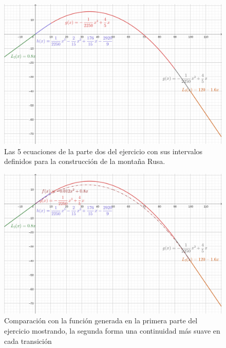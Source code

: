 \begin{figure}
	\centering
	\includegraphics[height = 0.25\textheight]{recursos/geogebra-export2.png}\par
	\caption*{Las 5 ecuaciones de la parte dos del ejercicio con sus intervalos definidos para la construcción de la montaña Rusa.}
\end{figure}
\begin{figure}
	\centering
	\includegraphics[height = 0.25\textheight]{recursos/geogebra-export3.png}\par
	\caption*{Comparación con la función generada en la primera parte del ejercicio mostrando, la segunda forma una continuidad más suave en cada transición}
\end{figure}


